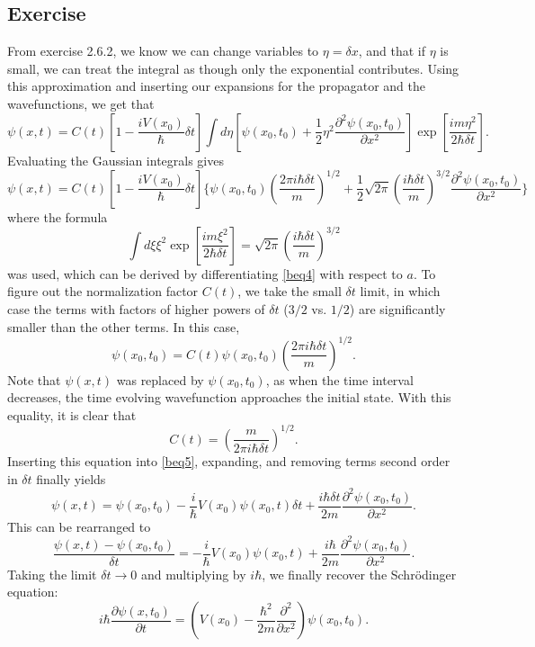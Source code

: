 \subsection{Exercise}
From exercise 2.6.2, we know we can change variables to $\eta=\delta x$, and that if $\eta$ is small, we can treat the integral as though only the exponential contributes. Using this approximation and inserting our expansions for the propagator and the wavefunctions, we get that
\begin{equation}
    \psi(x,t)=C(t)[1-\frac{iV(x_0)}\hbar\delta t]\int d\eta [\psi(x_0,t_0)+\frac 1 2 \eta^2\frac{\partial^2\psi(x_0,t_0)}{\partial x^2}]\exp[\frac{im\eta^2}{2\hbar \delta t}].
\end{equation}
Evaluating the Gaussian integrals gives
\begin{equation}\label{beq5}
    \psi(x,t)=C(t)[1-\frac{iV(x_0)}\hbar\delta t]\Bigg\{\psi(x_0,t_0)\left(\frac{2\pi i\hbar\delta t}{m}\right)^{1/2}+\frac 1 2 \sqrt{2\pi} \left( \frac{i\hbar \delta t}{m}\right )^{3/2}\frac{\partial^2\psi(x_0,t_0)}{\partial x^2}\Bigg\}
\end{equation}
where the formula 
\begin{equation}
    \int d\xi \xi^2 \exp[\frac{im\xi^2}{2\hbar \delta t}]=\sqrt{2\pi}\left(\frac{i\hbar\delta t}m\right)^{3/2}
\end{equation}
was used, which can be derived by differentiating \eqref{beq4} with respect to $a$. To figure out the normalization factor $C(t)$, we take the small $\delta t$ limit, in which case the terms with factors of higher powers of $\delta t$ ($3/2$ vs. $1/2$) are significantly smaller than the other terms. In this case,
\begin{equation} 
    \psi(x_0,t_0)=C(t)\psi(x_0,t_0)\left(\frac{2\pi i\hbar\delta t}{m}\right)^{1/2}.
\end{equation}
Note that $\psi(x,t)$ was replaced by $\psi(x_0,t_0)$, as when the time interval decreases, the time evolving wavefunction approaches the initial state. With this equality, it is clear that 
\begin{equation}
    C(t)=\left(\frac{m}{2\pi i \hbar \delta t}\right)^{1/2}.
\end{equation}
Inserting this equation into \eqref{beq5}, expanding, and removing terms second order in $\delta t$ finally yields
\begin{equation}
    \psi(x,t)=\psi(x_0,t_0)-\frac i \hbar V(x_0)\psi(x_0,t)\delta t+\frac{i\hbar \delta t}{2m}\frac{\partial^2\psi(x_0,t_0)}{\partial x^2}.
\end{equation}
This can be rearranged to 
\begin{equation}
    \frac{\psi(x,t)-\psi(x_0,t_0)}{\delta t}=-\frac i \hbar V(x_0)\psi(x_0,t)+\frac{i\hbar }{2m}\frac{\partial^2\psi(x_0,t_0)}{\partial x^2}.
\end{equation}
Taking the limit $\delta t\to 0$ and multiplying by $i\hbar$, we finally recover the Schrödinger equation:
\begin{equation}
    i\hbar \frac{\partial \psi(x,t_0)}{\partial t}=\left(V(x_0)-\frac{\hbar^2}{2m}\frac{\partial^2}{\partial x^2}\right)\psi(x_0,t_0).
\end{equation}